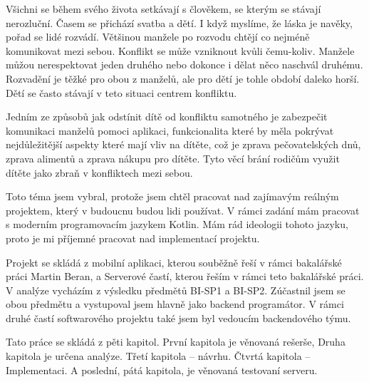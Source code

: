 Všichni se během svého života setkávají s člověkem, se kterým se stávají nerozluční. Časem se přichází svatba a dětí. I když myslíme, že láska je navěky, pořad se lidé rozvádí. Většinou manžele po rozvodu chtějí co nejméně komunikovat mezi sebou. Konflikt se může vzniknout kvůli čemu-koliv. Manžele můžou nerespektovat jeden druhého nebo dokonce i dělat něco naschvál druhému. Rozvadění je těžké pro obou z manželů, ale pro dětí je tohle období daleko horší. Dětí se často stávají v teto situaci centrem konfliktu.  


Jedním ze způsobů jak odstínit dítě od konfliktu samotného je zabezpečit komunikaci manželů pomoci aplikaci,  funkcionalita které by měla pokrývat nejdůležitější aspekty které mají vliv na dítěte, což je zprava pečovatelských dnů, zprava alimentů a zprava nákupu pro dítěte. Tyto věcí brání rodičům využit dítěte jako zbraň v konfliktech mezi sebou.

Toto téma jsem vybral, protože jsem chtěl pracovat nad zajímavým reálným projektem, který v budoucnu budou lidi používat. V rámci zadání mám pracovat s moderním programovacím jazykem Kotlin. Mám rád ideologii tohoto jazyku, proto je mi příjemné pracovat nad implementací projektu.


Projekt se skládá z mobilní aplikaci, kterou souběžně řeší v rámci bakalářské práci Martin Beran, a Serverové častí, kterou řeším v rámci teto bakalářské práci. V analýze vycházím z výsledku předmětů BI-SP1 a BI-SP2. Zúčastnil jsem se obou předmětu a vystupoval jsem hlavně jako backend programátor. V rámci druhé častí softwarového projektu také jsem byl vedoucím backendového týmu.


Tato práce se skládá z pěti kapitol. První kapitola je věnovaná rešerše, Druha kapitola je určena analýze. Třetí kapitola – návrhu. Čtvrtá kapitola – Implementaci. A poslední, pátá kapitola, je věnovaná testovaní serveru.